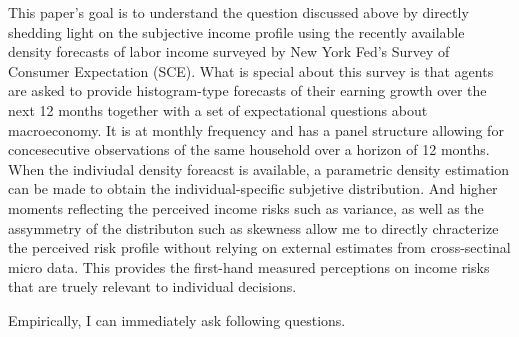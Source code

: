 \documentclass[12pt,notitlepage,onecolumn,aps,pra]{article}
\begin{document}
This paper's goal is to understand the question discussed above by
directly shedding light on the subjective income profile using the
recently available density forecasts of labor income surveyed by New
York Fed's Survey of Consumer Expectation (SCE). What is special about
this survey is that agents are asked to provide histogram-type forecasts
of their earning growth over the next 12 months together with a set of
expectational questions about macroeconomy. It is at monthly frequency
and has a panel structure allowing for concesecutive observations of the
same household over a horizon of 12 months. When the indiviudal density
foreacst is available, a parametric density estimation can be made to
obtain the individual-specific subjetive distribution. And higher
moments reflecting the perceived income risks such as variance, as well
as the assymmetry of the distributon such as skewness allow me to
directly chracterize the perceived risk profile without relying on
external estimates from cross-sectinal micro data. This provides the
first-hand measured perceptions on income risks that are truely relevant
to individual decisions.

Empirically, I can immediately ask following questions.
\end{document}
